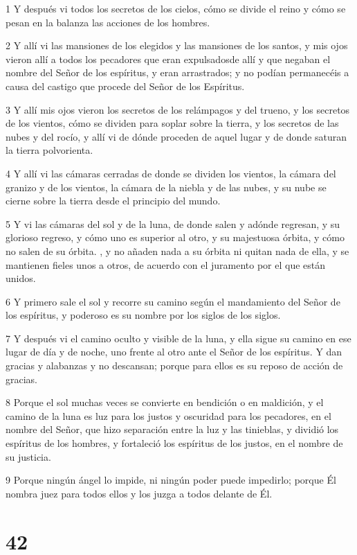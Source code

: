 \par 1 Y después vi todos los secretos de los cielos, cómo se divide el reino y cómo se pesan en la balanza las acciones de los hombres.
\par 2 Y allí vi las mansiones de los elegidos y las mansiones de los santos, y mis ojos vieron allí a todos los pecadores que eran expulsados ​​de allí y que negaban el nombre del Señor de los espíritus, y eran arrastrados; y no podían permanecéis a causa del castigo que procede del Señor de los Espíritus.
\par 3 Y allí mis ojos vieron los secretos de los relámpagos y del trueno, y los secretos de los vientos, cómo se dividen para soplar sobre la tierra, y los secretos de las nubes y del rocío, y allí vi de dónde proceden de aquel lugar y de donde saturan la tierra polvorienta.
\par 4 Y allí vi las cámaras cerradas de donde se dividen los vientos, la cámara del granizo y de los vientos, la cámara de la niebla y de las nubes, y su nube se cierne sobre la tierra desde el principio del mundo.
\par 5 Y vi las cámaras del sol y de la luna, de donde salen y adónde regresan, y su glorioso regreso, y cómo uno es superior al otro, y su majestuosa órbita, y cómo no salen de su órbita. , y no añaden nada a su órbita ni quitan nada de ella, y se mantienen fieles unos a otros, de acuerdo con el juramento por el que están unidos.
\par 6 Y primero sale el sol y recorre su camino según el mandamiento del Señor de los espíritus, y poderoso es su nombre por los siglos de los siglos.
\par 7 Y después vi el camino oculto y visible de la luna, y ella sigue su camino en ese lugar de día y de noche, uno frente al otro ante el Señor de los espíritus. Y dan gracias y alabanzas y no descansan; porque para ellos es su reposo de acción de gracias.
\par 8 Porque el sol muchas veces se convierte en bendición o en maldición, y el camino de la luna es luz para los justos y oscuridad para los pecadores, en el nombre del Señor, que hizo separación entre la luz y las tinieblas, y dividió los espíritus de los hombres, y fortaleció los espíritus de los justos, en el nombre de su justicia.
\par 9 Porque ningún ángel lo impide, ni ningún poder puede impedirlo; porque Él nombra juez para todos ellos y los juzga a todos delante de Él.

\chapter{42}

